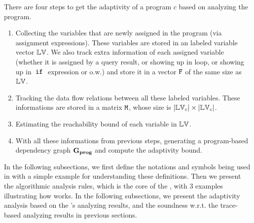 %
%
There are four steps to get the adaptivity of a program ${c}$ based on analyzing the program. 
\begin{enumerate}
\item Collecting the variables that are newly assigned in the program (via assignment expressions). These variables are stored in an labeled variable vector $\mathbb{LV}$. 
We also track extra information of each assigned variable (whether it is assigned by a query result, or showing up in loop, or showing up in $\;\mathtt{if}\;$ expression or o.w.) and store it in a vector $\mathtt{F}$ of the same size as $\mathbb{LV}$.
%
\item Tracking the data flow relations between all these labeled variables. These informations are stored in a matrix $\mathtt{M}$, whose size is $|\mathbb{LV}_c| \times |\mathbb{LV}_c|$. 
%
\item Estimating the reachability bound of each variable in $\mathbb{LV}$.
%
\item With all these informations from previous steps, generating a program-based dependency graph $\mathtt{\bf{G_{prog}}}$ and compute the adaptivity bound.
\end{enumerate}

In the following subsections, 
we first define the notations and symbols being used in \THESYSTEM  with a simple example for understanding these definitions. 
Then we present the algorithmic analysis rules, which is the core of the \THESYSTEM, with
3 examples illustrating how \THESYSTEM  works.
In the following subsections, we present the adaptivity analysis based on the \THESYSTEM's analyzing results, and the soundness w.r.t. the trace-based analyzing results in previous sections.

